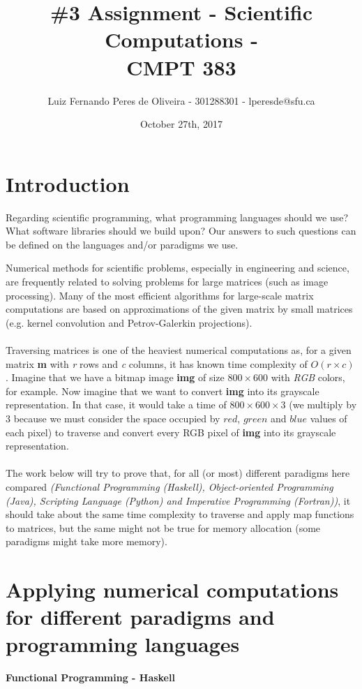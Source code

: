 \documentclass[conference]{IEEEtran}
\title{\#3 Assignment - Scientific Computations -\\ CMPT 383}
\author{Luiz Fernando Peres de Oliveira - 301288301 - lperesde@sfu.ca}
\date{October 27th, 2017}
\begin{document}
\maketitle

\section{Introduction}
Regarding scientific programming, what programming languages should we use? What software libraries should we build upon? Our answers to such questions can be defined on the languages and/or paradigms we use.

Numerical methods for scientific problems, especially in engineering and science, are frequently related to solving problems for large matrices (such as image processing). Many of the most efficient algorithms for large-scale matrix computations are based on approximations of the given matrix by small matrices (e.g. kernel convolution and Petrov-Galerkin projections).
\\\\
Traversing matrices is one of the heaviest numerical computations as, for a given matrix \textbf{m} with \textit{r} rows and \textit{c} columns, it has known time complexity of $O(r\times c)$. Imagine that we have a bitmap image \textbf{img} of size $800 \times 600$ with \textit{RGB} colors, for example. Now imagine that we want to convert \textbf{img} into its grayscale representation.  In that case, it would take a time of $800 \times 600 \times 3$ (we multiply by 3 because we must consider the space occupied by $red$, $green$ and $blue$ values of each pixel) to traverse and convert every RGB pixel of \textbf{img} into its grayscale representation.
\\\\
The work below will try to prove that, for all (or most) different paradigms here compared \textit{(Functional Programming (Haskell), Object-oriented Programming (Java), Scripting Language (Python) and Imperative Programming (Fortran))}, it should take about the same time complexity to traverse and apply map functions to matrices, but the same might not be true for memory allocation (some paradigms might take more memory).
\section{Applying numerical computations for different paradigms and programming languages}

\textbf{ Functional Programming - Haskell }
\end{document}
